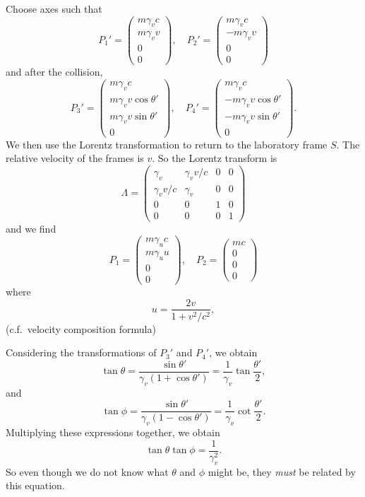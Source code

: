 \documentclass[a4paper]{article}
\begin{document}
Choose axes such that
\[
  P_1' =
  \begin{pmatrix}
    m\gamma_v c\\
    m\gamma_v v\\
    0\\
    0
  \end{pmatrix},\quad
  P_2' =
  \begin{pmatrix}
    m\gamma_v c\\
    -m\gamma_v v\\
    0\\
    0
  \end{pmatrix}
\]
and after the collision,
\[
  P_3' =
  \begin{pmatrix}
    m\gamma_v c\\
    m\gamma_v v\cos \theta'\\
    m\gamma_v v\sin \theta'\\
    0
  \end{pmatrix},\quad
  P_4' =
  \begin{pmatrix}
    m\gamma_v c\\
    -m\gamma_v v\cos \theta'\\
    -m \gamma_v v\sin \theta'\\
    0
  \end{pmatrix}.
\]
We then use the Lorentz transformation to return to the laboratory frame $S$. The relative velocity of the frames is $v$. So the Lorentz transform is
\[
  \Lambda =
  \begin{pmatrix}
    \gamma_v & \gamma_v v/c & 0 & 0\\
    \gamma_v v/c & \gamma_v & 0 & 0\\
    0 & 0 & 1 & 0\\
    0 & 0 & 0 & 1
  \end{pmatrix}
\]
and we find
\[
  P_1 =
  \begin{pmatrix}
    m\gamma_u c\\
    m\gamma_u u\\
    0\\
    0
  \end{pmatrix},\quad
  P_2 =
  \begin{pmatrix}
    mc\\
    0\\
    0\\
    0
  \end{pmatrix}
\]
where
\[
  u = \frac{2v}{1 + v^2/c^2},
\]
(c.f.\ velocity composition formula)

Considering the transformations of $P_3'$ and $P_4'$, we obtain
\[
  \tan \theta = \frac{\sin \theta'}{\gamma_v (1 + \cos \theta')} = \frac{1}{\gamma_v}\tan \frac{\theta'}{2},
\]
and
\[
  \tan \phi = \frac{\sin \theta'}{\gamma_v(1 - \cos \theta')} = \frac{1}{\gamma_v}\cot \frac{\theta'}{2}.
\]
Multiplying these expressions together, we obtain
\[
  \tan \theta\tan \phi = \frac{1}{\gamma_v^2}.
\]
So even though we do not know what $\theta$ and $\phi$ might be, they \emph{must} be related by this equation.
\end{document}
